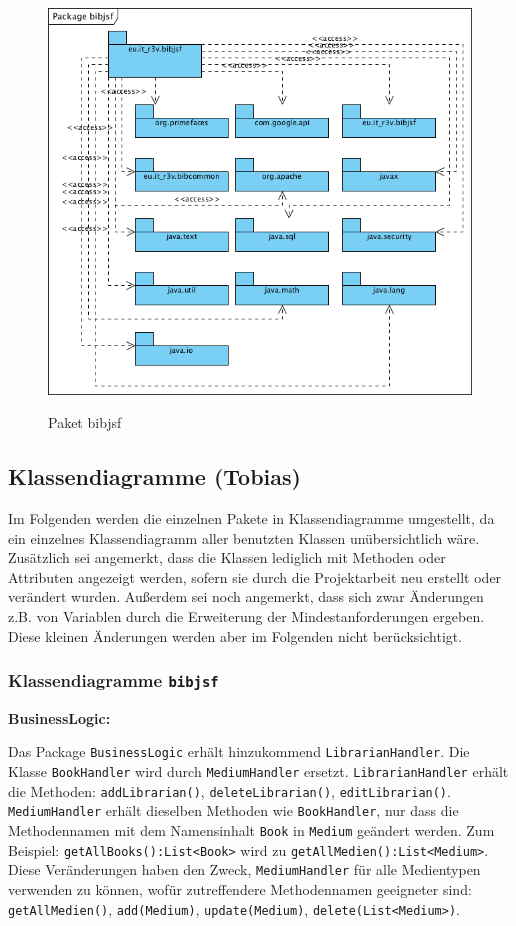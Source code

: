 \documentclass[fontsize=12pt,paper=a4,twoside]{scrartcl}
\begin{document}
\begin{figure} [H] 
\caption{Paket bibjsf} \centering
 \includegraphics[width=1\textwidth]{Diagramme/Packagebibjsf.png} 
 \label{pic:PackagebibjsfUebersicht} 
\end{figure}

\subsection{Klassendiagramme (Tobias)}

Im Folgenden werden die einzelnen Pakete in Klassendiagramme umgestellt, da 
ein einzelnes Klassendiagramm aller benutzten Klassen unübersichtlich wäre.
Zusätzlich sei angemerkt, dass die Klassen lediglich mit Methoden oder Attributen
angezeigt werden, sofern sie durch die Projektarbeit neu erstellt oder verändert wurden. Außerdem sei noch angemerkt, dass sich zwar Änderungen z.B. von Variablen durch die Erweiterung der Mindestanforderungen ergeben. Diese kleinen Änderungen werden aber im Folgenden nicht berücksichtigt.
\newpage
\subsubsection{Klassendiagramme \texttt{bibjsf}}

\textbf{BusinessLogic:}

Das Package \texttt{BusinessLogic} erhält hinzukommend \texttt{LibrarianHandler}. Die Klasse
\texttt{BookHandler} wird durch \texttt{MediumHandler} ersetzt.
\texttt{LibrarianHandler} erhält die Methoden:
\texttt{addLibrarian()},
\texttt{deleteLibrarian()},
\texttt{editLibrarian()}. \\
\texttt{MediumHandler} erhält dieselben Methoden wie \texttt{BookHandler}, nur dass die Methodennamen 
mit dem Namensinhalt \texttt{Book} in \texttt{Medium} geändert werden. Zum Beispiel:
\texttt{getAllBooks():List<Book>} wird zu  \texttt{getAllMedien():List<Medium>}. Diese Veränderungen haben den Zweck, \texttt{MediumHandler} für alle Medientypen verwenden zu können, wofür zutreffendere Methodennamen geeigneter sind:
\texttt{getAllMedien()},
\texttt{add(Medium)},
\texttt{update(Medium)},
\texttt{delete(List<Medium>)}.
\end{document}
